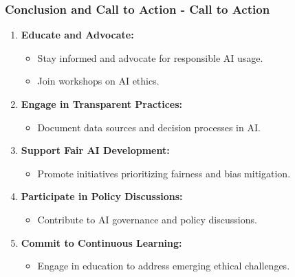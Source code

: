 \documentclass[aspectratio=169]{beamer}
\begin{document}
\begin{frame}[fragile]
    \frametitle{Conclusion and Call to Action - Call to Action}
    
    \begin{enumerate}
        \item \textbf{Educate and Advocate:}
        \begin{itemize}
            \item Stay informed and advocate for responsible AI usage.
            \item Join workshops on AI ethics.
        \end{itemize}
        
        \item \textbf{Engage in Transparent Practices:}
        \begin{itemize}
            \item Document data sources and decision processes in AI.
        \end{itemize}
        
        \item \textbf{Support Fair AI Development:}
        \begin{itemize}
            \item Promote initiatives prioritizing fairness and bias mitigation.
        \end{itemize}
        
        \item \textbf{Participate in Policy Discussions:}
        \begin{itemize}
            \item Contribute to AI governance and policy discussions.
        \end{itemize}
        
        \item \textbf{Commit to Continuous Learning:}
        \begin{itemize}
            \item Engage in education to address emerging ethical challenges.
        \end{itemize}
    \end{enumerate}
\end{frame}
\end{document}

